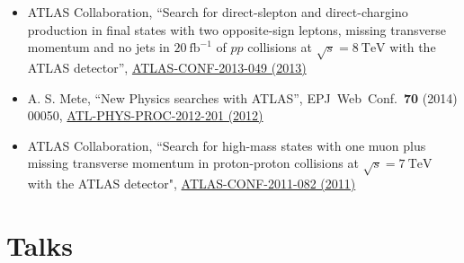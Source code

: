 \documentclass[a4paper,10pt]{article}
\begin{document}
\begin{itemize}
	\item ATLAS Collaboration, 
	``Search for direct-slepton and direct-chargino production in final states with two opposite-sign leptons, missing transverse momentum 
	and no jets in $20\ \mathrm{fb}^{-1}$ of $pp$ collisions at $\sqrt{s} = 8\ \mathrm{TeV}$ with the ATLAS detector'', 
	\href{https://atlas.web.cern.ch/Atlas/GROUPS/PHYSICS/CONFNOTES/ATLAS-CONF-2013-049/}{ATLAS-CONF-2013-049 (2013)} 
	\item A. S. Mete, 
	``New Physics searches with ATLAS'', 
	EPJ\ Web\ Conf.\ {\bf 70} (2014) 00050, 
	\href{https://cds.cern.ch/record/1478973}{ATL-PHYS-PROC-2012-201 (2012)}
	\item ATLAS Collaboration, 
	``Search for high-mass states with one muon plus missing transverse momentum in proton-proton collisions at $\sqrt{s} = 7\ \mathrm{TeV}$ with the ATLAS detector", 
	\href{https://atlas.web.cern.ch/Atlas/GROUPS/PHYSICS/CONFNOTES/ATLAS-CONF-2011-082/}{ATLAS-CONF-2011-082 (2011)}
\end{itemize}

\section{Talks}
\end{document}
